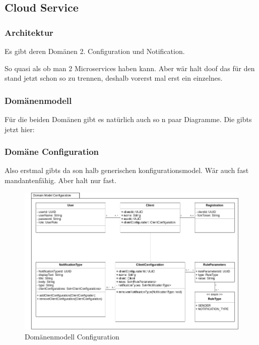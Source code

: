 
\subsection{Cloud Service}\label{subsec:cloud-service}

\subsubsection{Architektur}

Es gibt deren Domänen 2. Configuration und Notification.

So quasi als ob man 2 Microservices haben kann. Aber wär halt doof das für den stand jetzt schon so zu trennen, deshalb vorerst mal erst ein einzelnes.

\clearpage

\subsubsection{Domänenmodell}


Für die beiden Domänen gibt es natürlich auch so n paar Diagramme. Die gibts jetzt hier:


\subsubsection*{Domäne Configuration}

Also erstmal gibts da son halb generischen konfigurationsmodel.
Wär auch fast mandantenfähig.
Aber halt nur fast.

\begin{figure}[h]
    \centering
    \begin{minipage}[b]{1.0\textwidth}
        \includegraphics[width=\textwidth]{graphics/Class_Configuration_Domain}
        \caption{Domänenmodell Configuration}
    \end{minipage}
\end{figure}

